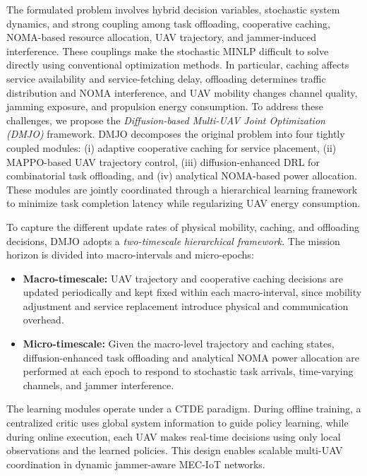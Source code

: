 \documentclass[journal]{IEEEtran}
\begin{document}
The formulated problem involves hybrid decision variables, stochastic system dynamics, and strong coupling among task offloading, cooperative caching, NOMA-based resource allocation, UAV trajectory, and jammer-induced interference. These couplings make the stochastic MINLP difficult to solve directly using conventional optimization methods. In particular, caching affects service availability and service-fetching delay, offloading determines traffic distribution and NOMA interference, and UAV mobility changes channel quality, jamming exposure, and propulsion energy consumption. To address these challenges, we propose the \textit{Diffusion-based Multi-UAV Joint Optimization (DMJO)} framework. DMJO decomposes the original problem into four tightly coupled modules: (i) adaptive cooperative caching for service placement, (ii) MAPPO-based UAV trajectory control, (iii) diffusion-enhanced DRL for combinatorial task offloading, and (iv) analytical NOMA-based power allocation. These modules are jointly coordinated through a hierarchical learning framework to minimize task completion latency while regularizing UAV energy consumption.

To capture the different update rates of physical mobility, caching, and offloading decisions, DMJO adopts a \textit{two-timescale hierarchical framework}. The mission horizon is divided into macro-intervals and micro-epochs:
\begin{itemize}
    \item \textbf{Macro-timescale:} UAV trajectory and cooperative caching decisions are updated periodically and kept fixed within each macro-interval, since mobility adjustment and service replacement introduce physical and communication overhead.
    \item \textbf{Micro-timescale:} Given the macro-level trajectory and caching states, diffusion-enhanced task offloading and analytical NOMA power allocation are performed at each epoch to respond to stochastic task arrivals, time-varying channels, and jammer interference.
\end{itemize}
The learning modules operate under a CTDE paradigm. During offline training, a centralized critic uses global system information to guide policy learning, while during online execution, each UAV makes real-time decisions using only local observations and the learned policies. This design enables scalable multi-UAV coordination in dynamic jammer-aware MEC-IoT networks.



\end{document}
